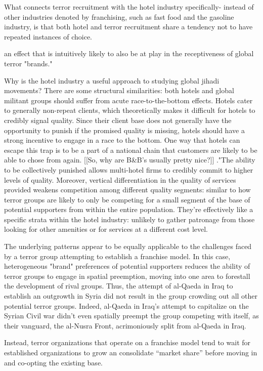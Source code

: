 \documentclass{article}
\begin{document}
What connects terror recruitment with the hotel industry specifically-
instead of other industries denoted by franchising, such as fast food
and the gasoline industry, is that both hotel and terror recruitment
share a tendency not to have repeated instances of choice.

 an effect that is intuitively likely to also be at play in the
receptiveness of global terror "brands."

Why is the hotel industry a useful approach to studying global jihadi
movements? There are some structural similarities: both hotels and
global militant groups should suffer from acute race-to-the-bottom
effects. Hotels cater to generally non-repeat clients, which
theoretically makes it difficult for hotels to credibly signal
quality. Since their client base does not generally have the
opportunity to punish if the promised quality is missing, hotels
should have a strong incentive to engage in a race to the bottom. One
way that hotels can escape this trap is to be a part of a national
chain that customers are likely to be able to chose from again.  [[So,
why are B\&B's usually pretty nice?]] ."The ability to be collectively
punished allows multi-hotel firms to credibly commit to higher levels
of quality. Moreover, vertical differentiation in the quality of
services provided weakens competition among different quality
segments: similar to how terror groups are likely to only be competing
for a small segment of the base of potential supporters from within
the entire population. They're effectively like a specific strata
within the hotel industry: unlikely to gather patronage from those
looking for other amenities or for services at a different cost level.
 

The underlying patterns appear to be equally applicable to the
challenges faced by a terror group attempting to establish a franchise
model. In this case, heterogeneous "brand" preferences of potential supporters
reduces the ability of terror groups to engage in spatial preemption,
moving into one area to forestall the development of rival
groups. Thus, the attempt of al-Qaeda in Iraq to establish an
outgrowth in Syria did not result in the group crowding out all other
potential terror groups. Indeed, al-Qaeda in Iraq's attempt to
capitalize on the Syrian Civil war didn't even spatially preempt the
group competing with itself, as their vanguard, the al-Nusra Front,
acrimoniously split from al-Qaeda in Iraq.

 Instead, terror organizations that operate on a franchise model tend
 to wait for established organizations to grow an consolidate ``market
 share'' before moving in and co-opting the existing base.
\end{document}
